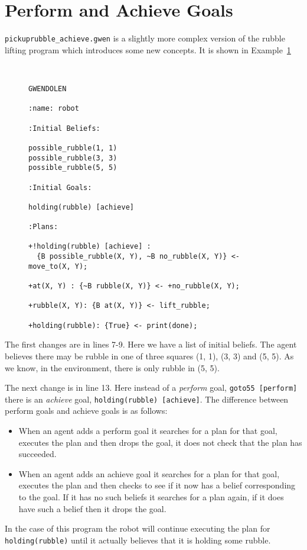 \section{Perform and Achieve Goals}
\lstinline{pickuprubble_achieve.gwen} is a slightly more complex
version of the rubble lifting program which introduces some new
concepts.  It is shown in
Example~\ref{code:pickuprubble_achieve}
\begin{figure}[htb]
\begin{ourexample}
\label{code:pickuprubble_achieve} \quad \\
\begin{lstlisting}[basicstyle=\sffamily,style=easslisting,language=Gwendolen]
GWENDOLEN

:name: robot

:Initial Beliefs:

possible_rubble(1, 1)
possible_rubble(3, 3)
possible_rubble(5, 5)

:Initial Goals:

holding(rubble) [achieve]

:Plans:

+!holding(rubble) [achieve] : 
  {B possible_rubble(X, Y), ~B no_rubble(X, Y)} <- move_to(X, Y);

+at(X, Y) : {~B rubble(X, Y)} <- +no_rubble(X, Y);

+rubble(X, Y): {B at(X, Y)} <- lift_rubble;

+holding(rubble): {True} <- print(done);
\end{lstlisting}
\end{ourexample}
\end{figure}
The first changes are in lines 7-9.  Here we have a list of initial
beliefs.  The agent believes there
may be rubble in one of three squares (1, 1), (3, 3) and (5, 5).  As
we know, in the environment, there is only rubble in (5,
5).

The next change is in line 13.  Here instead of a \emph{perform}
goal, \lstinline{goto55 [perform]}
there is an \emph{achieve} goal,
\lstinline{holding(rubble) [achieve]}.  The difference between perform
goals and achieve goals is as follows:
\begin{itemize}
\item When an agent adds a perform goal it searches for a plan for
  that goal, executes the plan and then drops the goal, it does not
  check that the plan has succeeded.
\item When an agent adds an achieve goal it searches for a plan for
  that goal, executes the plan and then checks to see if it now has a
  belief corresponding to the goal.  If it has no such beliefs it
  searches for a plan again, if it does have such a belief then it
  drops the goal.
\end{itemize}
In the case of this program the robot will continue executing the plan
for \lstinline{holding(rubble)} until it actually believes that it is
holding some rubble.

